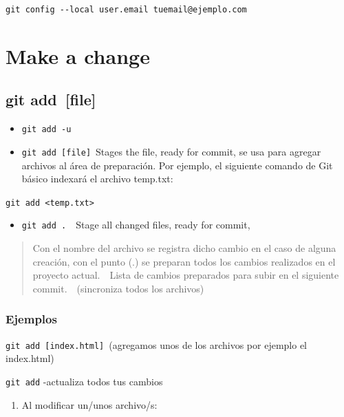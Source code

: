 \documentclass[
  a2paper,
]{article}
\providecommand{\tightlist}{%
  \setlength{\itemsep}{0pt}\setlength{\parskip}{0pt}}\usepackage{longtable,booktabs,array}
\begin{document}
\texttt{git\ config\ -\/-local\ user.email~tuemail@ejemplo.com}

\hypertarget{make-a-change}{%
\section{Make a change}\label{make-a-change}}

\hypertarget{git-add-file}{%
\subsection{git add~{[}file{]}}\label{git-add-file}}

\begin{itemize}
\item
  \texttt{git\ add\ -u}
\item
  \texttt{git\ add\ {[}file{]}}~Stages the file, ready for commit, se
  usa para agregar archivos al área de preparación. Por ejemplo, el
  siguiente comando de Git básico indexará el archivo temp.txt:
\end{itemize}

\texttt{git\ add\ \textless{}temp.txt\textgreater{}}~~

\begin{itemize}
\tightlist
\item
  \texttt{git\ add\ .}~~Stage all changed files, ready for commit,
\end{itemize}

\begin{quote}
Con el nombre del archivo se registra dicho cambio en el caso de alguna
creación, con el punto (.) se preparan todos los cambios realizados en
el proyecto actual.~~Lista de cambios preparados para subir en el
siguiente commit.~~(sincroniza todos los archivos)
\end{quote}

\hypertarget{ejemplos-2}{%
\subsubsection{Ejemplos}\label{ejemplos-2}}

\texttt{git\ add~{[}index.html{]}}~(agregamos unos de los archivos por
ejemplo el index.html)

\texttt{git\ add} -actualiza todos tus cambios

\begin{enumerate}
\def\labelenumi{\arabic{enumi})}
\tightlist
\item
  Al modificar un/unos archivo/s:
\end{enumerate}
\end{document}
